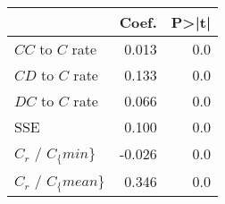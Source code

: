 \begin{tabular}{lrr}
\toprule
{} &  Coef. &  P>|t| \\
\midrule
$CC$ to $C$ rate   &  0.013 &    0.0 \\
$CD$ to $C$ rate   &  0.133 &    0.0 \\
$DC$ to $C$ rate   &  0.066 &    0.0 \\
SSE                &  0.100 &    0.0 \\
$C_r$ / $C_\{min\}$  & -0.026 &    0.0 \\
$C_r$ / $C_\{mean\}$ &  0.346 &    0.0 \\
\bottomrule
\end{tabular}
